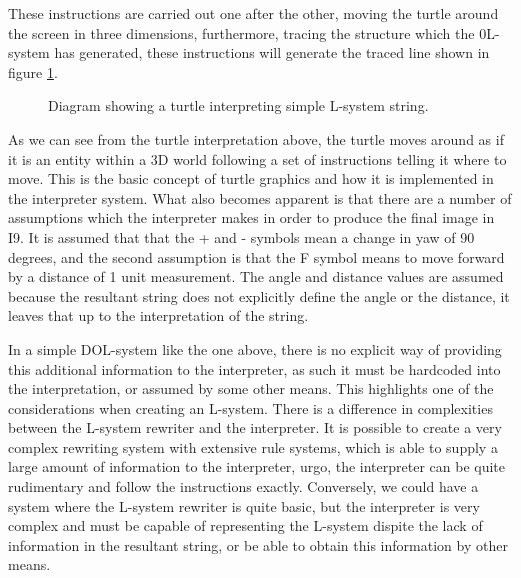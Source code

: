 \begin{flushleft}
These instructions are carried out one after the other, moving the turtle around the screen in three dimensions, furthermore, tracing the structure which the 0L-system has generated, these instructions will generate the traced line shown in figure \ref{basic turtle}.

\vspace{5mm}

\begin{figure}[htbp]
	{\centering
		\setlength{\fboxrule}{1pt}
		\vspace{7px}
		\caption{Diagram showing a turtle interpreting simple L-system string.} \label{basic turtle}
	}
\end{figure}
\FloatBarrier

\vspace{5mm}

As we can see from the turtle interpretation above, the turtle moves around as if it is an entity within a 3D world following a set of instructions telling it where to move. This is the basic concept of turtle graphics and how it is implemented in the interpreter system. What also becomes apparent is that there are a number of assumptions which the interpreter makes in order to produce the final image in I9. It is assumed that that the + and - symbols mean a change in yaw of 90 degrees, and the second assumption is that the F symbol means to move forward by a distance of 1 unit measurement. The angle and distance values are assumed because the resultant string does not explicitly define the angle or the distance, it leaves that up to the interpretation of the string. \\

\vspace{5mm}

In a simple DOL-system like the one above, there is no explicit way of providing this additional information to the interpreter, as such it must be hardcoded into the interpretation, or assumed by some other means. This highlights one of the considerations when creating an L-system. There is a difference in complexities between the L-system rewriter and the interpreter. It is possible to create a very complex rewriting system with extensive rule systems, which is able to supply a large amount of information to the interpreter, urgo, the interpreter can be quite rudimentary and follow the instructions exactly. Conversely, we could have a system where the L-system rewriter is quite basic, but the interpreter is very complex and must be capable of representing the L-system dispite the lack of information in the resultant string, or be able to obtain this information by other means. \\


\end{flushleft}
